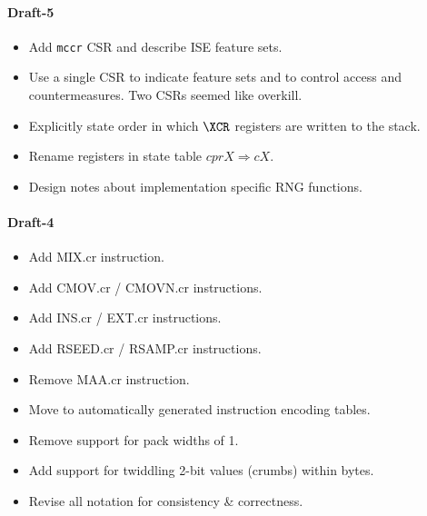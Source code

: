 
\paragraph{Draft-5}
\begin{itemize}
\item Add {\tt mccr} CSR and describe ISE feature sets.
\item Use a single CSR to indicate feature sets and to control
    access and countermeasures. Two CSRs seemed like overkill.
\item Explicitly state order in which $\XCR$ registers are written to 
    the stack.
\item Rename registers in state table $cprX \Rightarrow cX$.
\item Design notes about implementation specific RNG functions.
\end{itemize}


\paragraph{Draft-4}
\begin{itemize}
\item Add MIX.cr instruction.
\item Add CMOV.cr / CMOVN.cr instructions.
\item Add INS.cr / EXT.cr instructions.
\item Add RSEED.cr / RSAMP.cr instructions.
\item Remove MAA.cr instruction.
\item Move to automatically generated instruction encoding tables.
\item Remove support for pack widths of 1.
\item Add support for twiddling 2-bit values (crumbs) within bytes.
\item Revise all notation for consistency \& correctness.
\end{itemize}


